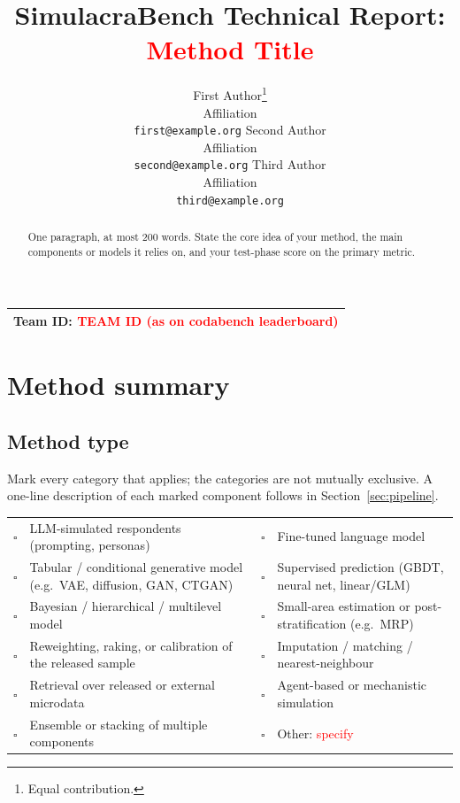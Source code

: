 \documentclass{article}
\title{SimulacraBench Technical Report:\\ \textcolor{red}{Method Title}}
\author{%
  First Author\thanks{Equal contribution.}\\
  Affiliation\\
  \texttt{first@example.org}
  \And
  Second Author\footnotemark[1]\\
  Affiliation\\
  \texttt{second@example.org}
  \And
  Third Author\\
  Affiliation\\
  \texttt{third@example.org}
}
\newcommand{\teamid}{\textcolor{red}{TEAM ID (as on codabench leaderboard)}}
\newcommand{\cbox}{$\square$}
\begin{document}
\maketitle

\begin{center}
\begin{tabular}{l}
\toprule
\textbf{Team ID:} \teamid \\
\bottomrule
\end{tabular}
\end{center}

\begin{abstract}
  One paragraph, at most 200 words. State the core idea of your method, the main components or models it relies on, and your test-phase score on the primary metric.
\end{abstract}

\section{Method summary}
\label{sec:method}

\subsection{Method type}
Mark every category that applies; the categories are not mutually exclusive. A one-line description of each marked component follows in Section~\ref{sec:pipeline}.

\begin{table}[h]
  \centering
  \small
  \begin{tabular}{@{}clcl@{}}
    \toprule
    \cbox & LLM-simulated respondents (prompting, personas) & \cbox & Fine-tuned language model \\
    \cbox & Tabular / conditional generative model (e.g.\ VAE, diffusion, GAN, CTGAN) & \cbox & Supervised prediction (GBDT, neural net, linear/GLM) \\
    \cbox & Bayesian / hierarchical / multilevel model & \cbox & Small-area estimation or post-stratification (e.g.\ MRP) \\
    \cbox & Reweighting, raking, or calibration of the released sample & \cbox & Imputation / matching / nearest-neighbour \\
    \cbox & Retrieval over released or external microdata & \cbox & Agent-based or mechanistic simulation \\
    \cbox & Ensemble or stacking of multiple components & \cbox & Other: \textcolor{red}{specify} \\
    \bottomrule
  \end{tabular}
\end{table}
\end{document}

